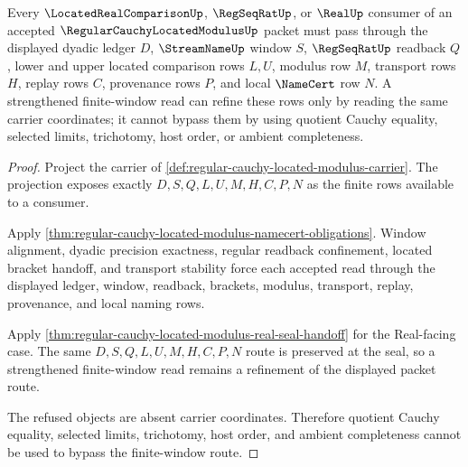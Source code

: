\begin{theorem}
\label{thm:regular-cauchy-located-modulus-window-nonescape}
Every $\LocatedRealComparisonUp$, $\RegSeqRatUp$, or $\RealUp$ consumer of an
accepted $\RegularCauchyLocatedModulusUp$ packet must pass through the displayed
dyadic ledger $D$, $\StreamNameUp$ window $S$, $\RegSeqRatUp$ readback $Q$,
lower and upper located comparison rows $L,U$, modulus row $M$, transport rows
$H$, replay rows $C$, provenance rows $P$, and local $\NameCert$ row $N$. A
strengthened finite-window read can refine these rows only by reading the same
carrier coordinates; it cannot bypass them by using quotient Cauchy equality,
selected limits, trichotomy, host order, or ambient completeness.
\end{theorem}
\begin{proof}
Project the carrier of
\autoref{def:regular-cauchy-located-modulus-carrier}. The projection exposes
exactly $D,S,Q,L,U,M,H,C,P,N$ as the finite rows available to a consumer.

Apply
\autoref{thm:regular-cauchy-located-modulus-namecert-obligations}. Window
alignment, dyadic precision exactness, regular readback confinement, located
bracket handoff, and transport stability force each accepted read through the
displayed ledger, window, readback, brackets, modulus, transport, replay,
provenance, and local naming rows.

Apply \autoref{thm:regular-cauchy-located-modulus-real-seal-handoff} for the
Real-facing case. The same $D,S,Q,L,U,M,H,C,P,N$ route is preserved at the
seal, so a strengthened finite-window read remains a refinement of the
displayed packet route.

The refused objects are absent carrier coordinates. Therefore quotient Cauchy
equality, selected limits, trichotomy, host order, and ambient completeness
cannot be used to bypass the finite-window route.
\end{proof}


\begin{closurestatus}{\RegularCauchyLocatedModulusUp}
  \theoryclosure{\seedClosure}
  \formalstatus{\unformalizedV}
\end{closurestatus}
